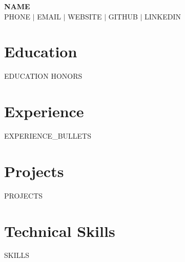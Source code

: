 \documentclass[{{FONT_SIZE}}pt,letterpaper]{extarticle}
\begin{document}
\begin{center}
  {\huge \textbf{{{NAME}}}} \\[{{HEADER_SKIP}}]
  {{PHONE}} $|$ {{EMAIL}} $|$ {{WEBSITE}} $|$ {{GITHUB}} $|$ {{LINKEDIN}}
\end{center}

\section{Education}
{{EDUCATION}}
{{HONORS}}

\section{Experience}
{{EXPERIENCE_BULLETS}}

\section{Projects}
{{PROJECTS}}

\section{Technical Skills}
{{SKILLS}}
\end{document}
